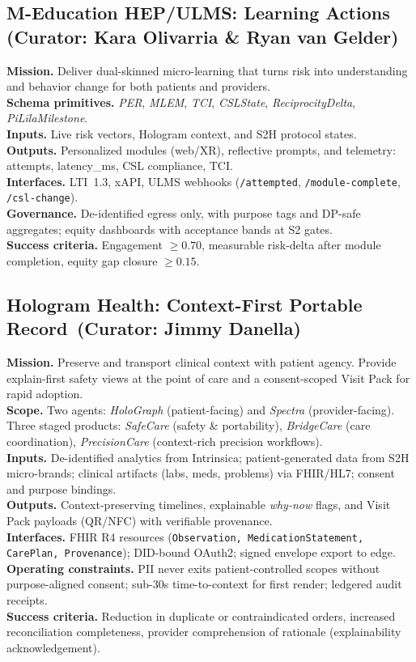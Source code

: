 \documentclass[11pt]{article}
\theoremstyle{plain}
\begin{document}
\subsection{M-Education HEP/ULMS: Learning Actions \,(Curator: Kara Olivarria \& Ryan van Gelder)}
\textbf{Mission.} Deliver dual-skinned micro-learning that turns risk into understanding and behavior change for both patients and providers.\\
\textbf{Schema primitives.} \emph{PER}, \emph{MLEM}, \emph{TCI}, \emph{CSLState}, \emph{ReciprocityDelta}, \emph{PiLīlaMilestone}.\\
\textbf{Inputs.} Live risk vectors, Hologram context, and S2H protocol states.\\
\textbf{Outputs.} Personalized modules (web/XR), reflective prompts, and telemetry: attempts, latency\_ms, CSL compliance, TCI.\\
\textbf{Interfaces.} LTI~1.3, xAPI, ULMS webhooks (\texttt{/attempted}, \texttt{/module-complete}, \texttt{/csl-change}).\\
\textbf{Governance.} De-identified egress only, with purpose tags and DP-safe aggregates; equity dashboards with acceptance bands at S2 gates.\\
\textbf{Success criteria.} Engagement $\ge 0.70$, measurable risk-delta after module completion, equity gap closure $\ge 0.15$.

\subsection{Hologram Health: Context-First Portable Record \,(Curator: Jimmy Danella)}
\textbf{Mission.} Preserve and transport clinical context with patient agency. Provide explain-first safety views at the point of care and a consent-scoped Visit Pack for rapid adoption.\\
\textbf{Scope.} Two agents: \emph{HoloGraph} (patient-facing) and \emph{Spectra} (provider-facing). Three staged products: \emph{SafeCare} (safety \& portability), \emph{BridgeCare} (care coordination), \emph{PrecisionCare} (context-rich precision workflows).\\
\textbf{Inputs.} De-identified analytics from Intrinsica; patient-generated data from S2H micro-brands; clinical artifacts (labs, meds, problems) via FHIR/HL7; consent and purpose bindings.\\
\textbf{Outputs.} Context-preserving timelines, explainable \emph{why-now} flags, and Visit Pack payloads (QR/NFC) with verifiable provenance.\\
\textbf{Interfaces.} FHIR R4 resources (\texttt{Observation, MedicationStatement, CarePlan, Provenance}); DID-bound OAuth2; signed envelope export to edge.\\
\textbf{Operating constraints.} PII never exits patient-controlled scopes without purpose-aligned consent; sub-30s time-to-context for first render; ledgered audit receipts.\\
\textbf{Success criteria.} Reduction in duplicate or contraindicated orders, increased reconciliation completeness, provider comprehension of rationale (explainability acknowledgement).
\end{document}
